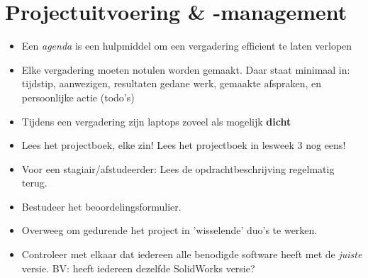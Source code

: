 \documentclass[24pt,a4paper]{article}
\begin{document}
\section{Projectuitvoering \& -management}
\begin{itemize}
      \mssep

      \item Een \textit{agenda} is een hulpmiddel om een vergadering efficient te laten verlopen
      \item Elke vergadering moeten notulen worden gemaakt. Daar staat minimaal in: tijdstip, aanwezigen, resultaten gedane werk, gemaakte afspraken, en persoonlijke actie (todo's)
      \item Tijdens een vergadering zijn laptops zoveel als mogelijk \textbf{dicht}
      \item Lees het projectboek, elke zin! Lees het projectboek in lesweek 3 nog eens!
      \item Voor een stagiair/afstudeerder: Lees de opdrachtbeschrijving regelmatig terug.
      \item Bestudeer het beoordelingsformulier.
      \item Overweeg om gedurende het project in 'wisselende' duo's te werken.
      \item Controleer met elkaar dat iedereen alle benodigde software heeft met de \textit{juiste} versie. BV: heeft iedereen dezelfde SolidWorks versie?

\end{itemize}
\end{document}
